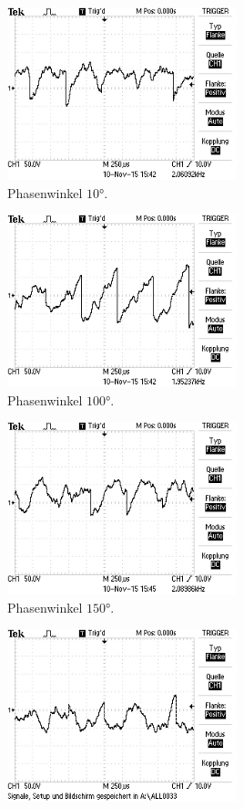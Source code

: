 \begin{figure}
\centering
\begin{subfigure}{0.48\textwidth}
\centering
\includegraphics[height=5cm]{Bilder/r/r10.JPG}
\caption{Phasenwinkel $10°$.}
\label{fig:rp10}
\end{subfigure}
\begin{subfigure}{0.48\textwidth}
\centering
\includegraphics[height=5cm]{Bilder/r/r100.JPG}
\caption{Phasenwinkel $100°$.}
\label{fig:rp100}
\end{subfigure}
\begin{subfigure}{0.48\textwidth}
\centering
\includegraphics[height=5cm]{Bilder/r/r150.JPG}
\caption{Phasenwinkel $150°$.}
\label{fig:rp150}
\end{subfigure}
\begin{subfigure}{0.48\textwidth}
\centering
\includegraphics[height=5cm]{Bilder/r/r190.JPG}

\end{subfigure}
\end{figure}
